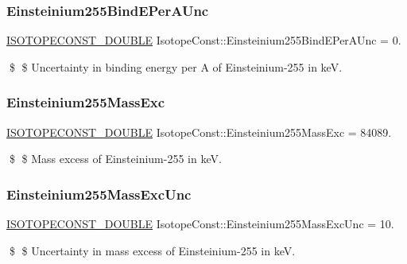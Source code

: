 \subsubsection{\texorpdfstring{Einsteinium255\+Bind\+E\+Per\+A\+Unc}{Einsteinium255BindEPerAUnc}}
{\footnotesize\ttfamily \mbox{\hyperlink{group___isotope_const-_macros_ga8f45a7272ce02c0b4c65c44636ed719a}{I\+S\+O\+T\+O\+P\+E\+C\+O\+N\+S\+T\+\_\+\+D\+O\+U\+B\+LE}} Isotope\+Const\+::\+Einsteinium255\+Bind\+E\+Per\+A\+Unc = 0.}

\$ \$ Uncertainty in binding energy per A of Einsteinium-\/255 in keV. \mbox{\label{group___isotope_const-_einsteinium-_es255_ga63846a0f3d4f53d035767019e020b3a4}} 
\subsubsection{\texorpdfstring{Einsteinium255\+Mass\+Exc}{Einsteinium255MassExc}}
{\footnotesize\ttfamily \mbox{\hyperlink{group___isotope_const-_macros_ga8f45a7272ce02c0b4c65c44636ed719a}{I\+S\+O\+T\+O\+P\+E\+C\+O\+N\+S\+T\+\_\+\+D\+O\+U\+B\+LE}} Isotope\+Const\+::\+Einsteinium255\+Mass\+Exc = 84089.}

\$ \$ Mass excess of Einsteinium-\/255 in keV. \mbox{\label{group___isotope_const-_einsteinium-_es255_ga13e171899c3490f5ff81665ff38e39f7}} 
\subsubsection{\texorpdfstring{Einsteinium255\+Mass\+Exc\+Unc}{Einsteinium255MassExcUnc}}
{\footnotesize\ttfamily \mbox{\hyperlink{group___isotope_const-_macros_ga8f45a7272ce02c0b4c65c44636ed719a}{I\+S\+O\+T\+O\+P\+E\+C\+O\+N\+S\+T\+\_\+\+D\+O\+U\+B\+LE}} Isotope\+Const\+::\+Einsteinium255\+Mass\+Exc\+Unc = 10.}

\$ \$ Uncertainty in mass excess of Einsteinium-\/255 in keV. \mbox{\label{group___isotope_const-_einsteinium-_es255_ga72b37d13f809b98d76d4b37b315bdea6}} 
